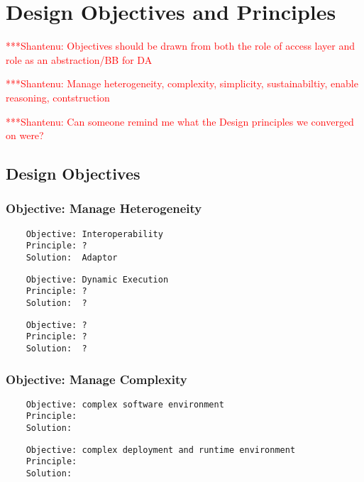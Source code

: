 \documentclass[a4paper,10pt]{article}
\newcommand{\jhanote}[1]{  {\textcolor{red}  { ***Shantenu: #1 }}}
\newcommand{\jhanote}[1]{}
\begin{document}
\section{Design Objectives and Principles}\label{saga_impls}


 \jhanote{Objectives should be drawn from both the role of access
   layer and role as an abstraction/BB for DA}

 \jhanote{Manage heterogeneity, complexity, simplicity,
   sustainabiltiy, enable reasoning, contstruction}

 \jhanote{Can someone remind me what the Design principles we
   converged on were?}

 \subsection{Design Objectives}


 \subsubsection{Objective: Manage Heterogeneity}
  \begin{verbatim}
    Objective: Interoperability
    Principle: ?
    Solution:  Adaptor
   \end{verbatim}


  \begin{verbatim}
    Objective: Dynamic Execution
    Principle: ?
    Solution:  ?
   \end{verbatim}

  \begin{verbatim}
    Objective: ?
    Principle: ?
    Solution:  ?
   \end{verbatim}

 \subsubsection{Objective: Manage Complexity}
 
  \begin{verbatim}
    Objective: complex software environment 
    Principle: 
    Solution:  
   \end{verbatim} 

   \begin{verbatim}
    Objective: complex deployment and runtime environment
    Principle: 
    Solution:  
   \end{verbatim}
\end{document}
